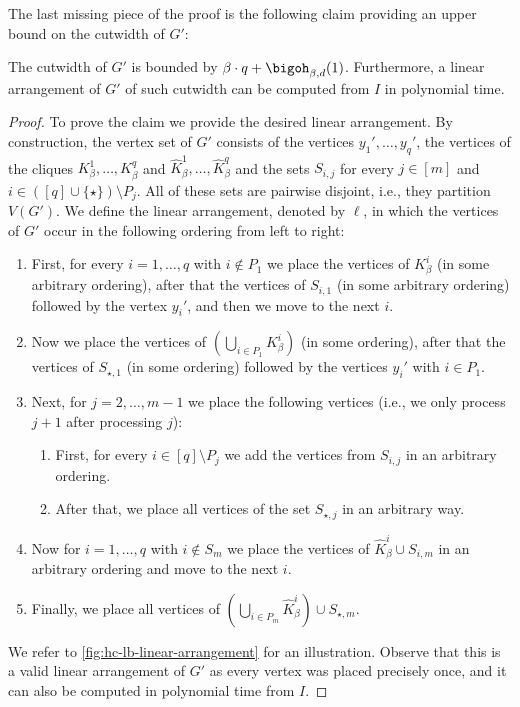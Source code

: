 \documentclass[a4paper,UKenglish,cleveref, autoref, thm-restate]{lipics-v2021}
\begin{document}
The last missing piece of the proof is the following claim providing an upper bound on the cutwidth of $G'$:
\begin{claim}
	The cutwidth of $G'$ is bounded by $\beta \cdot q + \bigoh_{\beta, d}(1)$.
	Furthermore, a linear arrangement of $G'$ of such cutwidth can be computed from $I$ in polynomial time.
\end{claim}

\begin{proof}
	To prove the claim we provide the desired linear arrangement. 
	By construction, the vertex set of $G'$ consists of the vertices $y_1', \dots, y_q'$, the vertices of the cliques $K_\beta^1, \dots, K_\beta^q$ and $\hat K_\beta^1, \dots, \hat K_\beta^q$ and the sets $S_{i,j}$ for every $j \in [m]$ and $i \in ([q] \cup \{\star\}) \setminus P_j$.
	All of these sets are pairwise disjoint, i.e., they partition $V(G')$. 
	We define the linear arrangement, denoted by $\ell$, in which the vertices of $G'$ occur in the following ordering from left to right:
	\begin{enumerate}
		\item First, for every $i = 1, \dots, q$ with $i \notin P_1$ we place the vertices of $K_\beta^i$ (in some arbitrary ordering), after that the vertices of $S_{i,1}$ (in some arbitrary ordering) followed by the vertex $y_i'$, and then we move to the next $i$.
		\item Now we place the vertices of $(\bigcup_{i \in P_1} K_\beta^{i})$ (in some ordering), after that the vertices of $S_{\star,1}$ (in some ordering) followed by the vertices $y_i'$ with $i \in P_1$.
		\item Next, for $j = 2, \dots, m-1$ we place the following vertices (i.e., we only process $j+1$ after processing $j$):
		\begin{enumerate}
			\item First, for every $i \in [q] \setminus P_j$ we add the vertices from $S_{i,j}$ in an arbitrary ordering. 
			\item After that, we place all vertices of the set $S_{\star, j}$ in an arbitrary way. 
		\end{enumerate}
		\item Now for $i = 1, \dots, q$ with $i \notin S_m$ we place the vertices of $\hat K_\beta^i \cup S_{i,m}$ in an arbitrary ordering 
		and move to the next $i$.
		\item Finally, we place all vertices of $(\bigcup_{i \in P_m} \hat K^i_\beta) \cup S_{\star,m}$.
	\end{enumerate}
	We refer to \cref{fig:hc-lb-linear-arrangement} for an illustration.
	Observe that this is a valid linear arrangement of $G'$ as every vertex was placed precisely once, and it can also be computed in polynomial time from $I$.
	

\end{proof}
\end{document}
